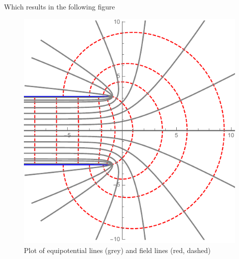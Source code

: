 \documentclass[a4paper,12pt]{article}
\begin{document}
Which results in the following figure
\begin{figure}[H]
	\centering
	\includegraphics[width=0.7\linewidth]{hw2.pdf}
	\caption{Plot of equipotential lines (grey) and field lines (red, dashed)}
	\label{fig:4}
\end{figure}
\end{document}
